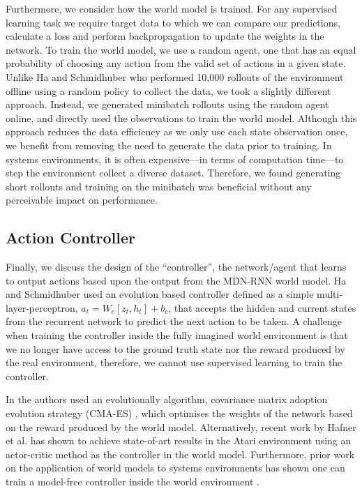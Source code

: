 Furthermore, we consider how the world model is trained. For any supervised learning task we require target data to which we can compare our predictions, calculate a loss and perform backpropagation to update the weights in the network. To train the world model, we use a random agent, one that has an equal probability of choosing any action from the valid set of actions in a given state. Unlike Ha and Schmidhuber \cite{ha2018worldmodels} who performed 10,000 rollouts of the environment offline using a random policy to collect the data, we took a slightly different approach. Instead, we generated minibatch rollouts using the random agent online, and directly used the observations to train the world model. Although this approach reduces the data efficiency as we only use each state observation once, we benefit from removing the need to generate the data prior to training. In systems environments, it is often expensive---in terms of computation time---to step the environment collect a diverse dataset. Therefore, we found generating short rollouts and training on the minibatch was beneficial without any perceivable impact on performance.

\subsection{Action Controller}
\label{sec:rlopt:subsec:actionctrl}

Finally, we discuss the design of the ``controller'', the network/agent that learns to output actions based upon the output from the MDN-RNN world model. Ha and Schmidhuber \cite{ha2018worldmodels} used an evolution based controller defined as a simple multi-layer-perceptron, $a_t = W_c[z_t, h_t] + b_c$, that accepts the hidden and current states from the recurrent network to predict the next action to be taken. A challenge when training the controller inside the fully imagined world environment is that we no longer have access to the ground truth state nor the reward produced by the real environment, therefore, we cannot use supervised learning to train the controller. 

In \cite{ha2018worldmodels} the authors used an evolutionally algorithm, covariance matrix adoption evolution strategy (CMA-ES) \cite{hansen2001completely, hansen2016cma}, which optimises the weights of the network based on the reward produced by the world model. Alternatively, recent work by Hafner et al. \cite{hafner2020dream, hafner2021mastering} has shown to achieve state-of-art results in the Atari environment using an actor-critic method as the controller in the world model. Furthermore, prior work on the application of world models to systems environments has shown one can train a model-free controller inside the world environment \cite{app10196685}.


